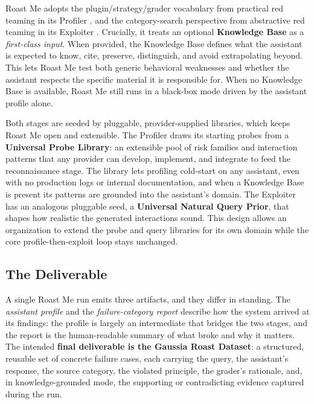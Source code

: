 \documentclass[11pt,a4paper]{article}
\begin{document}
Roast Me adopts the plugin/strategy/grader vocabulary from practical red teaming
in its Profiler \citep{promptfoo2026redteam}, and the category-search perspective
from abstractive red teaming in its Exploiter \citep{rahn2026abstractive}.
Crucially, it treats an optional \textbf{Knowledge Base} as a \emph{first-class
input}. When provided, the Knowledge Base defines what the assistant is expected
to know, cite, preserve, distinguish, and avoid extrapolating beyond. This lets
Roast Me test both generic behavioral weaknesses and whether the assistant
respects the specific material it is responsible for. When no Knowledge Base is
available, Roast Me still runs in a black-box mode driven by the assistant
profile alone.

Both stages are seeded by pluggable, provider-supplied libraries, which keeps
Roast Me open and extensible. The Profiler draws its starting probes from a
\textbf{Universal Probe Library}: an extensible pool of risk families and
interaction patterns that any provider can develop, implement, and integrate to
feed the reconnaissance stage. The library lets profiling cold-start on any
assistant, even with no production logs or internal documentation, and when a
Knowledge Base is present its patterns are grounded into the assistant's domain.
The Exploiter has an analogous pluggable seed, a \textbf{Universal Natural Query
Prior}, that shapes how realistic the generated interactions sound. This design
allows an organization to extend the probe and query libraries for its own
domain while the core profile-then-exploit loop stays unchanged.

\subsection{The Deliverable}

A single Roast Me run emits three artifacts, and they differ in standing. The
\emph{assistant profile} and the \emph{failure-category report} describe how the
system arrived at its findings: the profile is largely an intermediate that
bridges the two stages, and the report is the human-readable summary of what
broke and why it matters. The intended \textbf{final deliverable is the Gaussia
Roast Dataset}: a structured, reusable set of concrete failure cases, each
carrying the query, the assistant's response, the source category, the violated
principle, the grader's rationale, and, in knowledge-grounded mode, the
supporting or contradicting evidence captured during the run.
\end{document}
